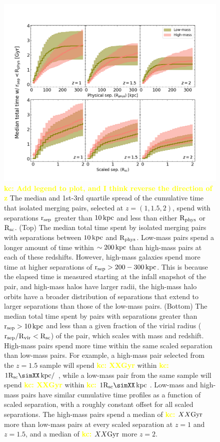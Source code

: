 \documentclass[twocolumn]{aastex631}
\newcommand{\kc}[1]{\textcolor{yellow}{\textbf{kc: #1}} }
\newcommand{\rsep}{\ensuremath{\rm r_{sep}}}
\newcommand{\Rvir}{\ensuremath{\rm R_{vir}}}
\newcommand{\Rphys}{\ensuremath{\rm R_{phys}}}
\newcommand{\Rsc}{\ensuremath{\rm R_{sc}}}
\newcommand{\rsep}{\ensuremath{\rm r_{sep}}}
\begin{document}
\begin{figure}[htb]
    \centering
    \includegraphics[width=\textwidth]{plots/bet-on-it/2_medtotal_PhScT.png}
    \caption{\kc{Add legend to plot, and I think reverse the direction of z} 
    The median and 1st-3rd quartile spread of the cumulative time that isolated merging pairs, selected at $z=(1,1.5,2)$, spend with separations \rsep{} greater than $10\mathrm{\,kpc}$ and less than either \Rphys{} or \Rsc{}.
    (Top) The median total time spent by isolated merging pairs with separations between $10\mathrm{\,kpc}$ and \Rphys{}.
    Low-mass pairs spend a longer amount of time within $\sim200\mathrm{\,kpc}$ than high-mass pairs at each of these redshifts. 
    However, high-mass galaxies spend more time at higher separations of $\rsep>200-300\kpc$. This is because the elapsed time is measured starting at the infall snapshot of the pair, and high-mass halos have larger radii, the high-mass halo orbits have a broader distribution of separations that extend to larger separations than those of the low-mass pairs.
    (Bottom) The median total time spent by pairs with separations greater than $\rsep>10\kpc$ and less than a given fraction of the virial radius ($\rsep/\Rvir<\Rsc$) of the pair, which scales with mass and redshift.  
    High-mass pairs spend more time within the same scaled separation than low-mass pairs. For example, a high-mass pair selected from the $z=1.5$ sample will spend \kc{XXGyr} within \kc{$1\Rsc\simXX\kpc/$}, while a low-mass pair from the same sample will spend \kc{XXGyr} within \kc{$1\Rsc\simXX\kpc$}. 
    Low-mass and high-mass pairs have similar cumulative time profiles as a function of scaled separation, with a roughly constant offset for all scaled separations. 
    The high-mass pairs spend a median of \kc{$XX\mathrm{Gyr}$} more than low-mass pairs at every scaled separation at $z=1$ and $z=1.5$, and a median of \kc{$XX\mathrm{Gyr}$} more $z=2$.
    }
    \label{fig:phys-vs-scaled}
\end{figure}
\end{document}
